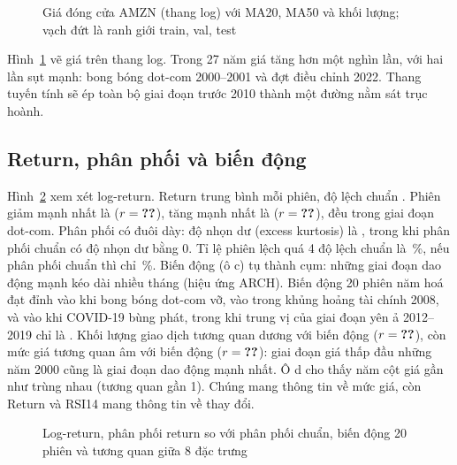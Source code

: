 \begin{figure}[H]
  \centering
  \caption{Giá đóng cửa AMZN (thang log) với MA20, MA50 và khối lượng; vạch đứt là ranh giới train, val, test}
  \label{fig:price}
\end{figure}

Hình~\ref{fig:price} vẽ giá trên thang log. Trong 27 năm giá tăng hơn một nghìn lần, với hai lần sụt mạnh: bong bóng
dot-com 2000--2001 và đợt điều chỉnh 2022. Thang tuyến tính sẽ ép toàn bộ giai đoạn trước 2010 thành một đường nằm sát
trục hoành.

\subsection{Return, phân phối và biến động}

Hình~\ref{fig:return} xem xét log-return. Return trung bình  mỗi phiên, độ lệch chuẩn
. Phiên giảm mạnh nhất là  ($r = \SL{amzn/ret/min}$), tăng mạnh nhất là
 ($r = \SL{amzn/ret/max}$), đều trong giai đoạn dot-com. Phân phối có đuôi dày: độ nhọn dư
(excess kurtosis) là , trong khi phân phối chuẩn có độ nhọn dư bằng 0. Tỉ lệ phiên lệch quá 4 độ lệch
chuẩn là \,\%, nếu phân phối chuẩn thì chỉ \,\%. Biến động
(ô c) tụ thành cụm: những giai đoạn dao động mạnh kéo dài nhiều tháng (hiệu ứng ARCH). Biến động 20 phiên năm hoá đạt
đỉnh  vào  khi bong bóng dot-com vỡ,
 vào  trong khủng hoảng tài chính 2008, và
 vào  khi COVID-19 bùng phát, trong khi trung vị của giai đoạn
yên ả 2012--2019 chỉ là . Khối lượng giao dịch tương quan dương với biến động
($r = \SL{amzn/lev/vol_volat}$), còn mức giá tương quan âm với biến động ($r = \SL{amzn/lev/close_volat}$): giai
đoạn giá thấp đầu những năm 2000 cũng là giai đoạn dao động mạnh nhất. Ô d cho thấy năm cột giá gần như trùng nhau
(tương quan gần 1). Chúng mang thông tin về mức giá, còn Return và RSI14 mang thông tin về thay đổi.

\begin{figure}[H]
  \centering
  \caption{Log-return, phân phối return so với phân phối chuẩn, biến động 20 phiên và tương quan giữa 8 đặc trưng}
  \label{fig:return}
\end{figure}

